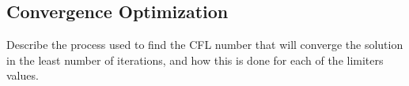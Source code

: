 
\subsection*{Convergence Optimization}
Describe the process used to find the CFL number that will converge the solution in the least number of iterations, and how this is done for each of the limiters values.




